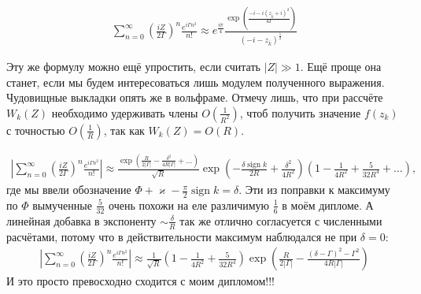 \documentclass[a4paper, 12pt]{article}
\DeclareMathOperator*{\sign}{sign}
\begin{document}
\begin{equation}
\begin{aligned}
    \sum\limits_{n=0}^{\infty}\left(\frac{iZ}{2\Gamma}\right)^n  \frac{e^{i\Gamma n^2}}{n!} \approx 
    e^{\frac{i\pi}{4}} \frac{\exp\left(\frac{-i-i(z_{\bar k}+i)^2}{4\Gamma}\right)}{(-i-z_{\bar k})^{\frac{1}{2}}}
\end{aligned}
\end{equation}

Эту же формулу можно ещё упростить, если считать $|Z|\gg 1$. Ещё проще она станет, если мы будем интересоваться лишь модулем полученного выражения. Чудовищные выкладки опять же в вольфраме. Отмечу лишь, что при рассчёте $W_k(Z)$ необходимо удерживать члены $O\left(\frac{1}{R^2}\right)$, чтоб получить значение $f(z_k)$ с точностью $O\left(\frac{1}{R}\right)$, так как $W_k(Z) = O(R)$.

\begin{equation}
\begin{aligned}
    \left|\sum\limits_{n=0}^{\infty}\left(\frac{iZ}{2\Gamma}\right)^n  \frac{e^{i\Gamma n^2}}{n!} \right|\approx 
    \frac{\exp\left(\frac{R}{2|\Gamma|} - \frac{\delta^2}{4R|\Gamma|}+\dots\right)}
    {\sqrt{R}}\exp\left(-\frac{\delta\sign k}{2R} + \frac{\delta^2}{4R^2}\right)\left(1-\frac{1}{4 R^2} + \frac{5}{32 R^4}+\dots\right),
\end{aligned}
\end{equation}
где мы ввели обозначение $\Phi + \varkappa - \frac{\pi}{2}\sign k  = \delta$. Эти из поправки к максимуму по $\Phi$ вымученные $\frac{5}{32}$ очень похожи на еле различимую $\frac{1}{6}$ в моём дипломе. А линейная добавка в экспоненту $\sim\frac{\delta}{R}$ так же отлично согласуется с численными расчётами, потому что в действительности максимум наблюдался не при $\delta=0$:
\begin{equation}
\begin{aligned}
    \left|\sum\limits_{n=0}^{\infty}\left(\frac{iZ}{2\Gamma}\right)^n  \frac{e^{i\Gamma n^2}}{n!} \right|\approx 
    \frac{1}{\sqrt{R}}\left(1-\frac{1}{4 R^2} + \frac{5}{32 R^4}\right)
    \exp\left(\frac{R}{2|\Gamma|} - \frac{\left(\delta -\Gamma\right)^2 - \Gamma^2}{4R|\Gamma|}\right)
\end{aligned}
\end{equation}
И это просто превосходно сходится с моим дипломом!!!
\end{document}
